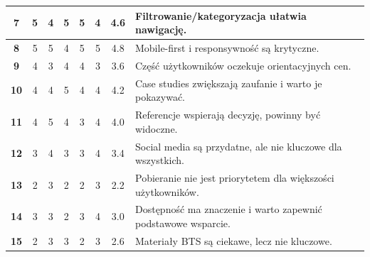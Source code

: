 \begin{longtable}{| p{} | p{} | p{} | p{} | p{} | p{} | p{} | p{} |}
\multicolumn{1}{|c|}{\textbf{7}} & \multicolumn{1}{|c|}{5} & \multicolumn{1}{|c|}{4} & \multicolumn{1}{|c|}{5} & \multicolumn{1}{|c|}{5} & \multicolumn{1}{|c|}{4} & \multicolumn{1}{|c|}{4.6} & Filtrowanie/kategoryzacja ułatwia nawigację. \\ \hline
\multicolumn{1}{|c|}{\textbf{8}} & \multicolumn{1}{|c|}{5} & \multicolumn{1}{|c|}{5} & \multicolumn{1}{|c|}{4} & \multicolumn{1}{|c|}{5} & \multicolumn{1}{|c|}{5} & \multicolumn{1}{|c|}{4.8} & Mobile-first i responsywność są krytyczne. \\ \hline
\multicolumn{1}{|c|}{\textbf{9}} & \multicolumn{1}{|c|}{4} & \multicolumn{1}{|c|}{3} & \multicolumn{1}{|c|}{4} & \multicolumn{1}{|c|}{4} & \multicolumn{1}{|c|}{3} & \multicolumn{1}{|c|}{3.6} & Część użytkowników oczekuje orientacyjnych cen. \\ \hline
\multicolumn{1}{|c|}{\textbf{10}} & \multicolumn{1}{|c|}{4} & \multicolumn{1}{|c|}{4} & \multicolumn{1}{|c|}{5} & \multicolumn{1}{|c|}{4} & \multicolumn{1}{|c|}{4} & \multicolumn{1}{|c|}{4.2} & Case studies zwiększają zaufanie i warto je pokazywać. \\ \hline
\multicolumn{1}{|c|}{\textbf{11}} & \multicolumn{1}{|c|}{4} & \multicolumn{1}{|c|}{5} & \multicolumn{1}{|c|}{4} & \multicolumn{1}{|c|}{3} & \multicolumn{1}{|c|}{4} & \multicolumn{1}{|c|}{4.0} & Referencje wspierają decyzję, powinny być widoczne. \\ \hline
\multicolumn{1}{|c|}{\textbf{12}} & \multicolumn{1}{|c|}{3} & \multicolumn{1}{|c|}{4} & \multicolumn{1}{|c|}{3} & \multicolumn{1}{|c|}{3} & \multicolumn{1}{|c|}{4} & \multicolumn{1}{|c|}{3.4} & Social media są przydatne, ale nie kluczowe dla wszystkich. \\ \hline
\multicolumn{1}{|c|}{\textbf{13}} & \multicolumn{1}{|c|}{2} & \multicolumn{1}{|c|}{3} & \multicolumn{1}{|c|}{2} & \multicolumn{1}{|c|}{2} & \multicolumn{1}{|c|}{3} & \multicolumn{1}{|c|}{2.2} & Pobieranie nie jest priorytetem dla większości użytkowników. \\ \hline
\multicolumn{1}{|c|}{\textbf{14}} & \multicolumn{1}{|c|}{3} & \multicolumn{1}{|c|}{3} & \multicolumn{1}{|c|}{2} & \multicolumn{1}{|c|}{3} & \multicolumn{1}{|c|}{4} & \multicolumn{1}{|c|}{3.0} & Dostępność ma znaczenie i warto zapewnić podstawowe wsparcie. \\ \hline
\multicolumn{1}{|c|}{\textbf{15}} & \multicolumn{1}{|c|}{2} & \multicolumn{1}{|c|}{3} & \multicolumn{1}{|c|}{3} & \multicolumn{1}{|c|}{2} & \multicolumn{1}{|c|}{3} & \multicolumn{1}{|c|}{2.6} & Materiały BTS są ciekawe, lecz nie kluczowe. \\ \hline
\end{longtable}
\egroup

